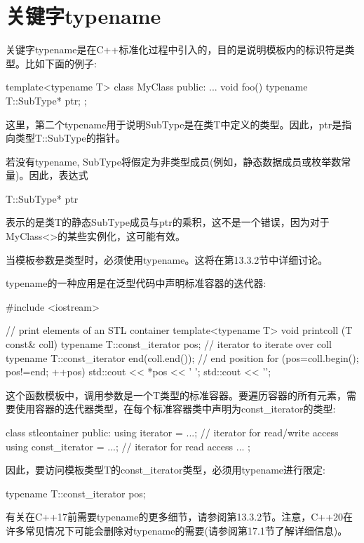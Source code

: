 \section{关键字typename}
关键字typename是在C++标准化过程中引入的，目的是说明模板内的标识符是类型。比如下面的例子:

\begin{cpp}
template<typename T>
class MyClass {
	public:
	...
	void foo() {
		typename T::SubType* ptr;
	}
};
\end{cpp}

这里，第二个typename用于说明SubType是在类T中定义的类型。因此，ptr是指向类型T::SubType的指针。

若没有typename, SubType将假定为非类型成员(例如，静态数据成员或枚举数常量)。因此，表达式

\begin{cpp}
T::SubType* ptr
\end{cpp}

表示的是类T的静态SubType成员与ptr的乘积，这不是一个错误，因为对于MyClass<>的某些实例化，这可能有效。

当模板参数是类型时，必须使用typename。这将在第13.3.2节中详细讨论。

typename的一种应用是在泛型代码中声明标准容器的迭代器:

\begin{cpp}
#include <iostream>

// print elements of an STL container
template<typename T>
void printcoll (T const& coll)
{
	typename T::const_iterator pos; // iterator to iterate over coll
	typename T::const_iterator end(coll.end()); // end position
	for (pos=coll.begin(); pos!=end; ++pos) {
		std::cout << *pos << ' ';
	}
	std::cout << '\n';
}
\end{cpp}

这个函数模板中，调用参数是一个T类型的标准容器。要遍历容器的所有元素，需要使用容器的迭代器类型，在每个标准容器类中声明为const\_iterator的类型:

\begin{cpp}
class stlcontainer {
	public:
	using iterator = ...; // iterator for read/write access
	using const_iterator = ...; // iterator for read access
	...
};
\end{cpp}

因此，要访问模板类型T的const\_iterator类型，必须用typename进行限定:

\begin{cpp}
typename T::const_iterator pos;
\end{cpp}

有关在C++17前需要typename的更多细节，请参阅第13.3.2节。注意，C++20在许多常见情况下可能会删除对typename的需要(请参阅第17.1节了解详细信息)。











